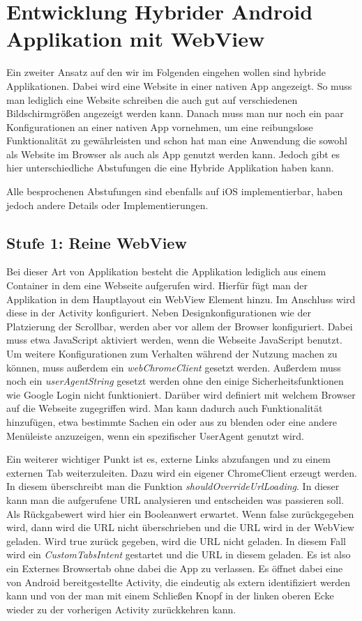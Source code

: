 \section{Entwicklung Hybrider Android Applikation mit WebView}

Ein zweiter Ansatz auf den wir im Folgenden eingehen wollen sind hybride Applikationen. Dabei wird eine Website in einer nativen App angezeigt. So muss man lediglich eine Website schreiben die auch gut auf verschiedenen Bildschirmgrößen angezeigt werden kann. Danach muss man nur noch ein paar Konfigurationen an einer nativen App vornehmen, um eine reibungslose Funktionalität zu gewährleisten und schon hat man eine Anwendung die sowohl als Website im Browser als auch als App genutzt werden kann. Jedoch gibt es hier unterschiedliche Abstufungen die eine Hybride Applikation haben kann.

Alle besprochenen Abstufungen sind ebenfalls auf iOS implementierbar, haben jedoch andere Details oder Implementierungen. 

\subsection{Stufe 1: Reine WebView}
Bei dieser Art von Applikation besteht die Applikation lediglich aus einem Container in dem eine Webseite aufgerufen wird. Hierfür fügt man der Applikation in dem Hauptlayout ein WebView Element hinzu. Im Anschluss wird diese in der Activity konfiguriert. Neben Designkonfigurationen wie der Platzierung der Scrollbar, werden aber vor allem der Browser konfiguriert. Dabei muss etwa JavaScript aktiviert werden, wenn die Webseite JavaScript benutzt. Um weitere Konfigurationen zum Verhalten während der Nutzung machen zu können, muss außerdem ein \textsl{webChromeClient} gesetzt werden. Außerdem muss noch ein \textsl{userAgentString} gesetzt werden ohne den einige Sicherheitsfunktionen wie Google Login nicht funktioniert. Darüber wird definiert mit welchem Browser auf die Webseite zugegriffen wird. Man kann dadurch auch Funktionalität hinzufügen, etwa bestimmte Sachen ein oder aus zu blenden oder eine andere Menüleiste anzuzeigen, wenn ein spezifischer UserAgent genutzt wird.

Ein weiterer wichtiger Punkt ist es, externe Links abzufangen und zu einem externen Tab weiterzuleiten. Dazu wird ein eigener ChromeClient erzeugt werden.  In diesem überschreibt man die Funktion \textsl{shouldOverrideUrlLoading}. In dieser kann man die aufgerufene URL analysieren und entscheiden was passieren soll. Als Rückgabewert wird hier ein Booleanwert erwartet. Wenn false zurückgegeben wird, dann wird die URL nicht überschrieben und die URL wird in der WebView geladen.  Wird true zurück gegeben, wird die URL nicht geladen. In diesem Fall wird ein \textsl{CustomTabsIntent} gestartet und die URL in diesem geladen. Es ist also ein Externes Browsertab ohne dabei die App zu verlassen. Es öffnet dabei eine von Android bereitgestellte Activity, die eindeutig als extern identifiziert werden kann und von der man mit einem Schließen Knopf in der linken oberen Ecke wieder zu der vorherigen Activity zurückkehren kann.

